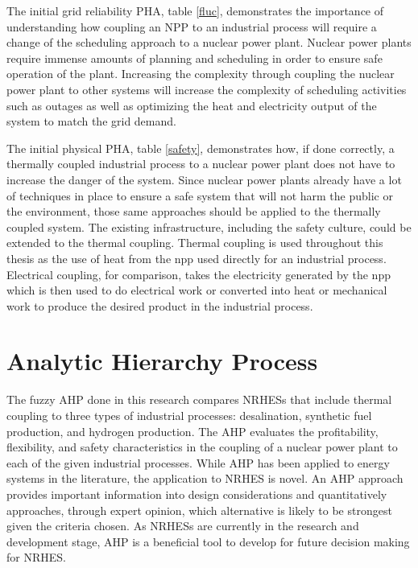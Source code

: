 \documentclass[12pt]{UIdahoMastersThesis}
\begin{document}
The initial grid reliability PHA, table \ref{fluc}, demonstrates the importance of understanding how coupling an NPP to an industrial process will require a change of the scheduling approach to a nuclear power plant. Nuclear power plants require immense amounts of planning and scheduling in order to ensure safe operation of the plant.  Increasing the complexity through coupling the nuclear power plant to other systems will increase the complexity of scheduling activities such as outages as well as optimizing the heat and electricity output of the system to match the grid demand. 

The initial physical PHA, table \ref{safety},  demonstrates how, if done correctly, a thermally coupled industrial process to a nuclear power plant does not have to increase the danger of the system.  Since nuclear power plants already have a lot of techniques in place to ensure a safe system that will not harm the public or the environment, those same approaches should be applied to the thermally coupled system. The existing infrastructure, including the safety culture, could be extended to the thermal coupling. Thermal coupling is used throughout this thesis as the use of heat from the \ac{npp} used directly for an industrial process.  Electrical coupling, for comparison, takes the electricity generated by the \ac{npp} which is then used to do electrical work or converted into heat or mechanical work to produce the desired product in the industrial process. 


\section{Analytic Hierarchy Process}
The fuzzy AHP done in this research compares NRHESs that include thermal coupling to three types of industrial processes: desalination, synthetic fuel production, and hydrogen production.  The AHP evaluates the profitability, flexibility, and safety characteristics in the coupling of a nuclear power plant to each of the given industrial processes. While AHP has been applied to energy systems in the literature, the application to NRHES is novel. An AHP approach provides important information into design considerations and quantitatively approaches, through expert opinion, which alternative is likely to be strongest given the criteria chosen. As NRHESs are currently in the research and development stage, AHP is a beneficial tool to develop for future decision making for NRHES. 
\end{document}
